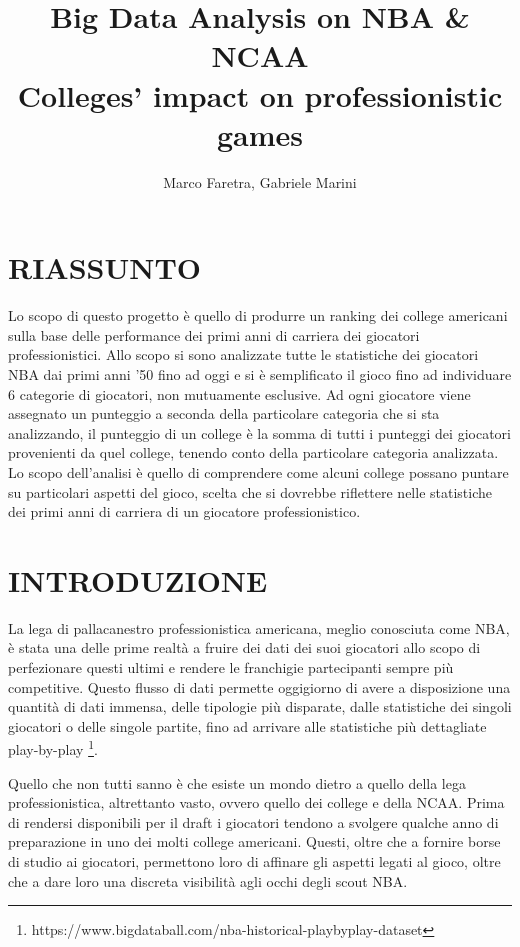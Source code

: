 \documentclass[10pt,a4paper,onecolumn]{article}
\author{Marco Faretra, Gabriele Marini}
\title{\textbf{Big Data Analysis on NBA \& NCAA}\\Colleges' impact on professionistic games}
\begin{document}
	
\maketitle
\thispagestyle{empty}
\pagestyle{empty}
		
\section*{RIASSUNTO}

Lo scopo di questo progetto è quello di produrre un ranking dei college americani sulla base delle performance dei primi anni di carriera dei giocatori professionistici. Allo scopo si sono analizzate tutte le statistiche dei giocatori NBA dai primi anni '50 fino ad oggi e si è semplificato il gioco fino ad individuare 6 categorie di giocatori, non mutuamente esclusive.
Ad ogni giocatore viene assegnato un punteggio a seconda della particolare categoria che si sta analizzando, il punteggio di un college è la somma di tutti i punteggi dei giocatori provenienti da quel college, tenendo conto della particolare categoria analizzata. Lo scopo dell'analisi è quello di comprendere come alcuni college possano puntare su particolari aspetti del gioco, scelta che si dovrebbe riflettere nelle statistiche dei primi anni di carriera di un giocatore professionistico.


\section{INTRODUZIONE} 

La lega di pallacanestro professionistica americana, meglio conosciuta come NBA, è stata una delle prime realtà a fruire dei dati dei suoi giocatori allo scopo di perfezionare questi ultimi e rendere le franchigie partecipanti sempre più competitive. Questo flusso di dati permette oggigiorno di avere a disposizione una quantità di dati immensa, delle tipologie più disparate, dalle statistiche dei singoli giocatori o delle singole partite, fino ad arrivare alle statistiche più dettagliate play-by-play \footnote{https://www.bigdataball.com/nba-historical-playbyplay-dataset}.

Quello che non tutti sanno è che esiste un mondo dietro a quello della lega professionistica, altrettanto vasto, ovvero quello dei college e della NCAA. Prima di rendersi disponibili per il draft i giocatori tendono a svolgere qualche anno di preparazione in uno dei molti college americani. Questi, oltre che a fornire borse di studio ai giocatori, permettono loro di affinare gli aspetti legati al gioco, oltre che a dare loro una discreta visibilità agli occhi degli scout NBA.
\end{document}
